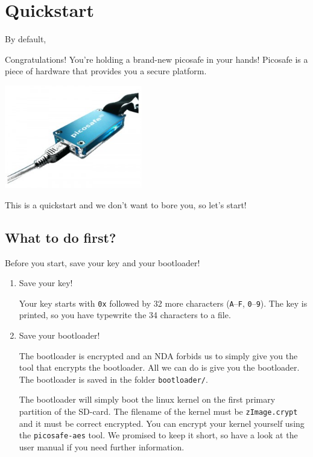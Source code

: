 


\initfloatingfigs


\mainmatter
\chapter*{Quickstart}

By default, 

Congratulations! You're holding a brand-new picosafe in your hands! Picosafe is
a piece of hardware that provides you a secure platform.

\includegraphics[width=6cm]{images/picosafe_splash.png}

This is a quickstart and we don't want to bore you, so let's start!

\section*{What to do first?}

Before you start, save your key and your bootloader!

\begin{enumerate}
  \item Save your key!
  
  Your key starts with \texttt{0x} followed by 32 more characters
  (\texttt{A}--\texttt{F}, \texttt{0}--\texttt{9}). The key is
  printed, so you have typewrite the 34 characters to a file.
  
  \item Save your bootloader!

  The bootloader is encrypted and an NDA forbids us to simply give you the tool
  that encrypts the bootloader. All we can do is give you the bootloader. The
  bootloader is saved in the folder \texttt{bootloader/}.
  
  The bootloader will simply boot the linux kernel on the first primary
  partition of the SD-card. The filename of the kernel must be
  \texttt{zImage.crypt} and it must be correct encrypted. You can encrypt your
  kernel yourself using the \texttt{picosafe-aes} tool. We promised to keep it
  short, so have a look at the user manual if you need further information.

\end{enumerate}

